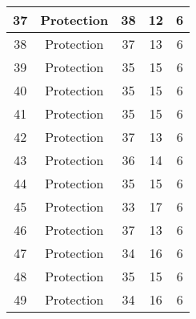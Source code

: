 \documentclass[results.tex]{subfiles}
\begin{document}
\begin{center}
\begin{tabular}{| c || c | c | c | c |}
            \hline
            37                      & Protection                   & 38                     & 12                      & 6                    \\
            \hline
            38                      & Protection                   & 37                     & 13                      & 6                    \\
            \hline
            39                      & Protection                   & 35                     & 15                      & 6                    \\
            \hline
            40                      & Protection                   & 35                     & 15                      & 6                    \\
            \hline
            41                      & Protection                   & 35                     & 15                      & 6                    \\
            \hline
            42                      & Protection                   & 37                     & 13                      & 6                    \\
            \hline
            43                      & Protection                   & 36                     & 14                      & 6                    \\
            \hline
            44                      & Protection                   & 35                     & 15                      & 6                    \\
            \hline
            45                      & Protection                   & 33                     & 17                      & 6                    \\
            \hline
            46                      & Protection                   & 37                     & 13                      & 6                    \\
            \hline
            47                      & Protection                   & 34                     & 16                      & 6                    \\
            \hline
            48                      & Protection                   & 35                     & 15                      & 6                    \\
            \hline
            49                      & Protection                   & 34                     & 16                      & 6                    \\
            \hline
        \end{tabular}
    \end{center}
\end{document}
